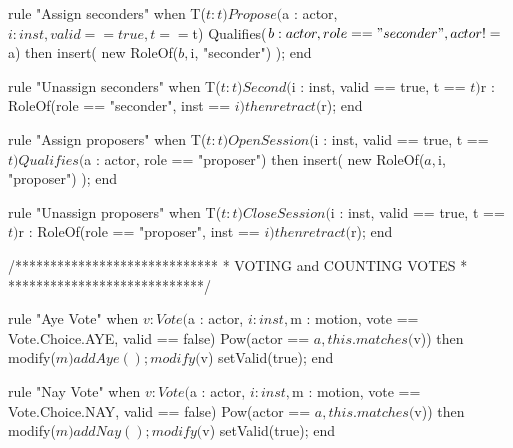 \begin{droolsinline}
rule "Assign seconders"
	when
		T($t : t)
		Propose($a : actor, $i : inst, valid == true, t == $t)
		Qualifies($b : actor, role == "seconder", actor != $a)
	then
		insert( new RoleOf($b, $i, "seconder") );
end

rule "Unassign seconders"
	when
		T($t : t)
		Second($i : inst, valid == true, t == $t)
		$r : RoleOf(role == "seconder", inst == $i)
	then
		retract($r);
end

rule "Assign proposers"
	when
		T($t : t)
		OpenSession($i : inst, valid == true, t == $t)
		Qualifies($a : actor, role == "proposer")
	then
		insert( new RoleOf($a, $i, "proposer") );
end

rule "Unassign proposers"
	when
		T($t : t)
		CloseSession($i : inst, valid == true, t == $t)
		$r : RoleOf(role == "proposer", inst == $i)
	then
		retract($r);
end

/*****************************
 * VOTING and COUNTING VOTES *
 ****************************/

rule "Aye Vote"
	when
		$v : Vote($a : actor, $i : inst, $m : motion, vote == Vote.Choice.AYE, valid == false)
		Pow(actor == $a, this.matches($v))
	then
		modify($m) {
			addAye();	
		}
		modify($v) {
			setValid(true);
		}
end

rule "Nay Vote"
	when
		$v : Vote($a : actor, $i : inst, $m : motion, vote == Vote.Choice.NAY, valid == false)
		Pow(actor == $a, this.matches($v))
	then
		modify($m) {
			addNay();
		}
		modify($v) {
			setValid(true);
		}
end
\end{droolsinline}